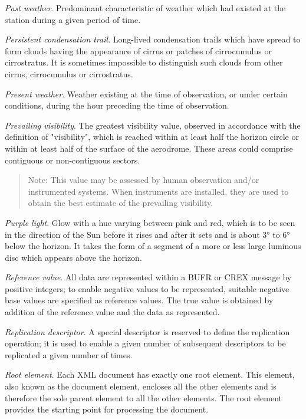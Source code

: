 \emph{Past weather}. Predominant characteristic of weather which had existed at the station during a given period of time.

\emph{Persistent condensation trail}. Long-lived condensation trails which have spread to form clouds having the appearance of cirrus or patches of cirrocumulus or cirrostratus. It is sometimes impossible to distinguish such clouds from other cirrus, cirrocumulus or cirrostratus.

\emph{Present weather}. Weather existing at the time of observation, or under certain conditions, during the hour preceding the time of observation.

\emph{Prevailing visibility}. The greatest visibility value, observed in accordance with the definition of "visibility", which is reached within at least half the horizon circle or within at least half of the surface of the aerodrome. These areas could comprise contiguous or non-contiguous sectors.

\begin{quote}
Note: This value may be assessed by human observation and/or instrumented systems. When instruments are installed, they are used to obtain the best estimate of the prevailing visibility.
\end{quote}

\emph{Purple light}. Glow with a hue varying between pink and red, which is to be seen in the direction of the Sun before it rises and after it sets and is about 3° to 6° below the horizon. It takes the form of a segment of a more or less large luminous disc which appears above the horizon.

\emph{Reference value}. All data are represented within a BUFR or CREX message by positive integers; to enable negative values to be represented, suitable negative base values are specified as reference values. The true value is obtained by addition of the reference value and the data as represented.

\emph{Replication descriptor}. A special descriptor is reserved to define the replication operation; it is used to enable a given number of subsequent descriptors to be replicated a given number of times.

\emph{Root element}. Each XML document has exactly one root element. This element, also known as the document element, encloses all the other elements and is therefore the sole parent element to all the other elements. The root element provides the starting point for processing the document.

